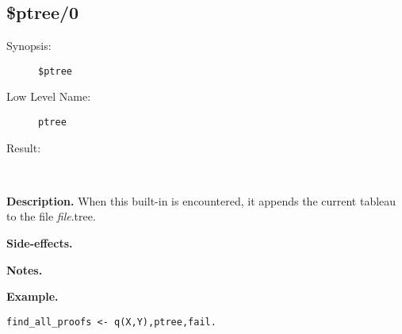 %
%
%
\subsection{\$ptree/0}

\begin{description}
\item[Synopsis:]
	{\tt \$ptree}
\item[Low Level Name:]
	{\tt ptree }
\item[Result:]\ \\
\end{description}

\vspace*{0.5cm}
\noindent
{\bf Description.}
When this built-in is encountered, it appends the current tableau
to the file {\em file}.tree.

\vspace*{0.5cm}
\noindent
{\bf Side-effects.}

\vspace*{0.5cm}
\noindent
{\bf Notes.}

\vspace*{0.5cm}
\noindent
{\bf Example.}
\begin{verbatim}
find_all_proofs <- q(X,Y),ptree,fail.
\end{verbatim}


